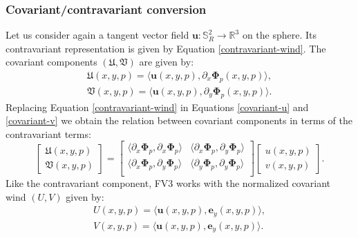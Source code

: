 \subsubsection{Covariant/contravariant conversion}
\label{anexo-cov-con}
Let us consider again a tangent vector field $\boldsymbol{u}: \mathbb{S}^2_R \to 
\mathbb{R}^3$ on the sphere. Its contravariant representation 
is given by Equation \eqref{contravariant-wind}.
The covariant components $(\mathfrak{U},\mathfrak{V})$ are given by:
\begin{align}
	\label{covariant-u}
	\mathfrak{U}(x,y,p) = \langle \boldsymbol{u}(x,y,p) , 	\partial_x\boldsymbol{\Phi}_p(x,y,p)  \rangle, \\
	\label{covariant-v}
	\mathfrak{V}(x,y,p) = \langle \boldsymbol{u}(x,y,p) , 	\partial_y\boldsymbol{\Phi}_p(x,y,p)  \rangle.
\end{align}
Replacing Equation \eqref{contravariant-wind} in 
Equations \eqref{covariant-u} and \eqref{covariant-v} we obtain
the relation between covariant components in terms of the
contravariant terms:
\begin{equation}
	\label{contravariant-to-covariant}
	\begin{bmatrix}
		\mathfrak{U}(x,y,p) \\
		\mathfrak{V}(x,y,p)
	\end{bmatrix}
	=
	\begin{bmatrix}
		\langle 	\partial_x\boldsymbol{\Phi}_p, \partial_x\boldsymbol{\Phi}_p \rangle
		& \langle 	\partial_x\boldsymbol{\Phi}_p, \partial_y\boldsymbol{\Phi}_p \rangle \\
		\langle 	\partial_x\boldsymbol{\Phi}_p, \partial_y\boldsymbol{\Phi}_p \rangle 
		& \langle   \partial_y\boldsymbol{\Phi}_p, \partial_y\boldsymbol{\Phi}_p \rangle \\
	\end{bmatrix}
	\begin{bmatrix}
		{u} (x,y,p) \\
		{v} (x,y,p) 
	\end{bmatrix}.
\end{equation}
Like the contravariant component, FV3 works with the normalized covariant wind $({U},{V})$ given by:
\begin{align}
	\label{norm-covariant-u}
	{U}(x,y,p) = \langle \boldsymbol{u}(x,y,p) , \boldsymbol{e}_y(x,y,p)  \rangle, \\
	\label{norm-covariant-v}
	{V}(x,y,p) = \langle \boldsymbol{u}(x,y,p) , \boldsymbol{e}_y(x,y,p)  \rangle.
\end{align}
